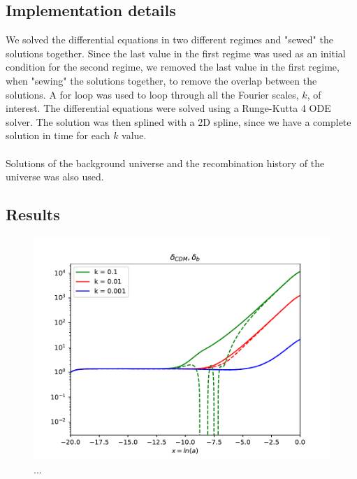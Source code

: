 \documentclass{aa}
\begin{document}
 


\subsection{Implementation details}
We solved the differential equations in two different regimes and "sewed" the solutions together.
Since the last value in the first regime was used as an initial condition for the second regime, we removed the last value 
in the first regime, when "sewing" the solutions together, to remove the overlap between the solutions. A for loop was used to loop through all the Fourier scales, $k$, of interest.
The differential equations were solved using a Runge-Kutta 4 ODE solver. The solution was then splined with a 2D spline, since we have a complete solution in time for each $k$ value.\\ \\
Solutions of the background universe and the recombination history of the universe was also used.

\subsection{Results}

\begin{figure}[h!]
   \includegraphics[scale=0.5]{Figures/M3_deltas.pdf}
   \caption{...}\label{fig:M3_deltas}
\end{figure}
\end{document}
